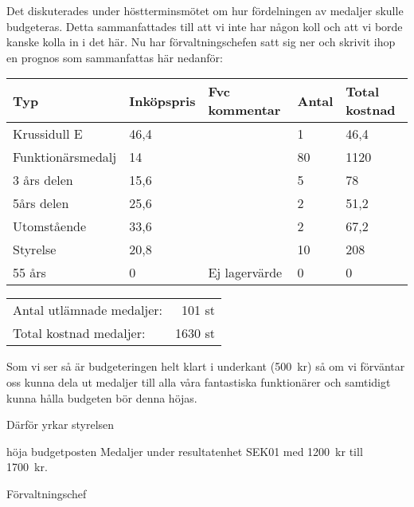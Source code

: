 \documentclass[../_main/handlingar.tex]{subfiles}
\begin{document}

Det diskuterades under höstterminsmötet om hur fördelningen av medaljer skulle budgeteras. Detta sammanfattades till att vi inte har någon koll och att vi borde kanske kolla in i det här. Nu har förvaltningschefen satt sig ner och skrivit ihop en prognos som sammanfattas här nedanför:



\begin{tabular}{| l | l | l | l | l |}
    \hline
    Typ & Inköpspris & Fvc kommentar & Antal & Total kostnad  \\
    \hline
    Krussidull E  & 46,4 &  & 1 & 46,4  \\
    \hline
    Funktionärsmedalj & 14 & & 80 & 1120\\
    \hline
    3 års delen & 15,6 &  & 5 & 78\\
    \hline
    5års delen & 25,6 &  & 2 & 51,2\\
    \hline
    Utomstående & 33,6 &  & 2 & 67,2\\
    \hline 
    Styrelse & 20,8 &  & 10 & 208\\
    \hline
    55 års & 0 & Ej lagervärde & 0 & 0\\
    \hline
 
\end{tabular}

\begin{tabular}{l r}
    
Antal utlämnade medaljer: & 101 st \\
Total kostnad medaljer: & 1630 st \\
    
\end{tabular}


Som vi ser så är budgeteringen helt klart i underkant (\SI{500}{kr}) så om vi förväntar oss kunna dela ut medaljer till alla våra fantastiska funktionärer och samtidigt kunna hålla budgeten bör denna höjas.

Därför yrkar styrelsen

\begin{attsatser}
  \att höja budgetposten Medaljer under resultatenhet SEK01 med \SI{1200}{kr} till \SI{1700}{kr}.
  
\end{attsatser}

\begin{signatures}{1}
    \ist
    \signature{\fvc}{Förvaltningschef}
\end{signatures}
\end{document}
